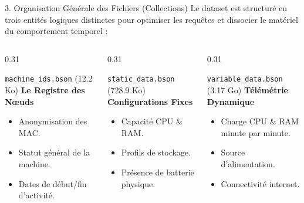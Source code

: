 \documentclass[10pt,aspectratio=169]{beamer}
\begin{document}
\begin{frame}{3. Organisation Générale des Fichiers (Collections)}
  Le dataset est structuré en trois entités logiques distinctes pour optimiser les requêtes et dissocier le matériel du comportement temporel :
  
  \vspace{0.5em}
  \begin{columns}[T]
    \begin{column}{0.31\textwidth}
      \begin{block}{\texttt{machine\_ids.bson} (12.2 Ko)}
        \textbf{Le Registre des Nœuds}
        \begin{itemize}
          \item Anonymisation des MAC.
          \item Statut général de la machine.
          \item Dates de début/fin d'activité.
        \end{itemize}
      \end{block}
    \end{column}
    
    \begin{column}{0.31\textwidth}
      \begin{block}{\texttt{static\_data.bson} (728.9 Ko)}
        \textbf{Configurations Fixes}
        \begin{itemize}
          \item Capacité CPU \& RAM.
          \item Profils de stockage.
          \item Présence de batterie physique.
        \end{itemize}
      \end{block}
    \end{column}
    
    \begin{column}{0.31\textwidth}
      \begin{block}{\texttt{variable\_data.bson} (3.17 Go)}
        \textbf{Télémétrie Dynamique}
        \begin{itemize}
          \item Charge CPU \& RAM minute par minute.
          \item Source d'alimentation.
          \item Connectivité internet.
        \end{itemize}
      \end{block}
    \end{column}
  \end{columns}
\end{frame}
\end{document}
